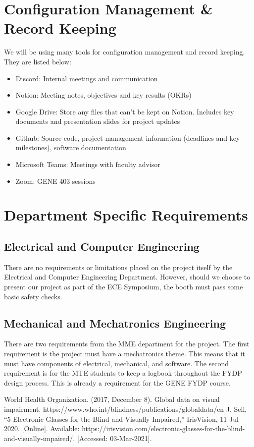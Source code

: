 \documentclass[a4paper,11pt]{article}
\begin{document}
\newpage
\section{Configuration Management \& Record Keeping}
We will be using many tools for configuration management and record keeping. They are listed below:
\begin{itemize}
    \item Discord: Internal meetings and communication
    \item Notion: Meeting notes, objectives and key results (OKRs)
    \item Google Drive: Store any files that can't be kept on Notion. Includes key documents and presentation slides for project updates
    \item Github: Source code, project management information (deadlines and key milestones), software documentation
    \item Microsoft Teams: Meetings with faculty advisor
    \item Zoom: GENE 403 sessions
\end{itemize}

\section{Department Specific Requirements}
\subsection{Electrical and Computer Engineering}
There are no requirements or limitations placed on the project itself by the Electrical and Computer Engineering Department. However, should we choose to present our project as part of the ECE Symposium, the booth must pass some basic safety checks.

\subsection{Mechanical and Mechatronics Engineering}
There are two requirements from the MME department for the project. The first requirement is the project must have a mechatronics theme. This means that it must have components of electrical, mechanical, and software. The second requirement is for the MTE students to keep a logbook throughout the FYDP design process. This is already a requirement for the GENE FYDP course.

\newpage

\begin{thebibliography}{9}
World Health Organization. (2017, December 8). Global data on visual impairment. https://www.who.int/blindness/publications/globaldata/en
J. Sell, “5 Electronic Glasses for the Blind and Visually Impaired,” IrisVision, 11-Jul-2020. [Online]. Available: https://irisvision.com/electronic-glasses-for-the-blind-and-visually-impaired/. [Accessed: 03-Mar-2021].
\end{thebibliography}
\end{document}
